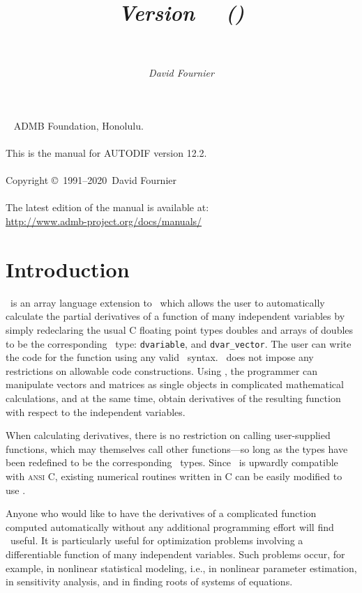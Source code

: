 \documentclass{admbmanual}
\title{%
  \largetitlepart{AUTODIF}
  \smalltitlepart{%
    A \cplus\ Array Language Extension\\
    with Automatic Differentiation\\
    for Use in Nonlinear Modeling and Statistics}
  \vspace{4ex}\textsf{\textit{Version \admbversion~~(\admbdate)\\[3pt]
      ~%
    }}\vspace{3ex}
}
\author{\textsf{\textit{David Fournier}}}
\newcommand\admbversion{12.2}
\newcommand\admbyear{2020}
\newcommand{\question}[1]{\bigskip\noindent{\bf #1?}\par\medskip\noindent}
\begin{document}
\maketitle

~\vfill
\noindent ADMB Foundation, Honolulu.\\\\
\noindent This is the manual for AUTODIF version \admbversion.\\\\
\noindent Copyright \copyright\ 1991--\admbyear\ David Fournier\\\\
\noindent The latest edition of the manual is available at:\\
\url{http://www.admb-project.org/docs/manuals/}

\tableofcontents

\chapter{Introduction}
\label{ch:introduction}

\question{What is \scAD}
\scAD\ is an array language extension to \cplus\ which allows the user to
automatically calculate the partial derivatives of a function of many
independent variables by simply redeclaring the usual C floating point types
doubles and arrays of doubles to be the corresponding \scAD\ type:
\texttt{dvariable}, and \texttt{dvar\_vector}. The user can write the code for
the function using any valid \cplus\ syntax. \scAD\ does not impose any
restrictions on allowable code constructions. Using \scAD, the programmer can
manipulate vectors and matrices as single objects in complicated mathematical
calculations, and at the same time, obtain derivatives of the resulting function
with respect to the independent variables.

When calculating derivatives, there is no restriction on calling user-supplied
functions, which may themselves call other functions---so long as the types have
been redefined to be the corresponding \scAD\ types. Since \cplus\ is upwardly
compatible with \textsc{ansi C}, existing numerical routines written in C can be
easily modified to use \scAD.

\question{Who should use \scAD}
Anyone who would like to have the derivatives of a complicated function computed
automatically without any additional programming effort will find \scAD\ useful.
It is particularly useful for optimization problems involving a differentiable
function of many independent variables. Such problems occur, for example, in
nonlinear statistical modeling, i.e., in nonlinear parameter estimation, in
sensitivity analysis, and in finding roots of systems of equations.
\end{document}
